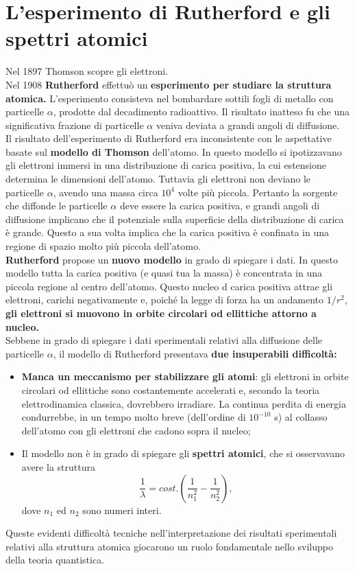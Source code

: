 \section{L'esperimento di Rutherford e gli spettri atomici}
Nel 1897 Thomson scopre gli elettroni.\\
Nel 1908 \textbf{Rutherford} effettuò un \textbf{esperimento per studiare la struttura atomica.} L'esperimento consisteva nel bombardare sottili fogli di metallo con particelle $\alpha$, prodotte dal decadimento radioattivo. Il risultato inatteso fu che una significativa frazione di particelle $\alpha$ veniva deviata a grandi angoli di diffusione.\\
Il risultato dell'esperimento di Rutherford era inconsistente con le aspettative basate sul \textbf{modello di Thomson} dell'atomo. In questo modello si ipotizzavano gli elettroni immersi in una distribuzione di carica positiva, la cui estensione determina le dimensioni dell'atomo. Tuttavia gli elettroni non deviano le particelle $\alpha$, avendo una massa circa $10^4$ volte più piccola. Pertanto la sorgente che diffonde le particelle $\alpha$ deve essere la carica positiva, e grandi angoli di diffusione implicano che il potenziale sulla superficie della distribuzione di carica è grande. Questo a sua volta implica che la carica positiva è confinata in una regione di spazio molto più piccola dell'atomo.\\
\textbf{Rutherford} propose un \textbf{nuovo modello} in grado di spiegare i dati. In questo modello tutta la carica positiva (e quasi tua la massa) è concentrata in una piccola regione al centro dell'atomo. Questo nucleo d carica positiva attrae gli elettroni, carichi negativamente e, poiché la legge di forza ha un andamento $1/r^2$, \textbf{gli elettroni si muovono in orbite circolari od ellittiche attorno a nucleo.}\\
Sebbene in grado di spiegare i dati sperimentali relativi alla diffusione delle particelle $\alpha$, il modello di Rutherford presentava \textbf{due insuperabili difficoltà:}
	\begin{itemize}
		\item \textbf{Manca un meccanismo per stabilizzare gli atomi}: gli elettroni in orbite circolari od ellittiche sono costantemente accelerati e, secondo la teoria elettrodinamica classica, dovrebbero irradiare. La continua perdita di energia condurrebbe, in un tempo molto breve (dell'ordine di $10^{-10}$ s) al collasso dell'atomo con gli elettroni che cadono sopra il nucleo;
		\item Il modello non è in grado di spiegare gli \textbf{spettri atomici}, che si osservavano avere la struttura
			\begin{equation}
				\boxed{
					\frac{1}{\lambda} = cost. \left( \frac{1}{n_1 ^2}-\frac{1}{n_2 ^2} \right),
					}
			\end{equation}
		dove $n_1$ ed $n_2$ sono numeri interi.
\end{itemize}

Queste evidenti difficoltà tecniche nell'interpretazione dei risultati sperimentali relativi alla struttura atomica giocarono un ruolo fondamentale nello sviluppo della teoria quantistica.
